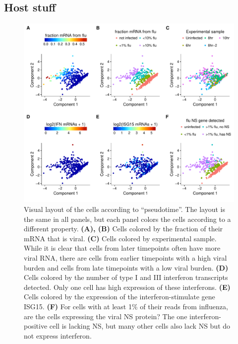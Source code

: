 \documentclass[9pt,lineno]{elife}
\begin{document}
\subsection{Host stuff}

\begin{figure}
\includegraphics[width=\linewidth]{figures/p_pseudo_merge.pdf}
\caption{\label{fig:pseudotime}
Visual layout of the cells according to ``pseudotime''.
The layout is the same in all panels, but each panel colors the cells according to a different property.
{\bf (A), (B)}
Cells colored by the fraction of their mRNA that is viral.
{\bf (C)}
Cells colored by experimental sample.
While it is clear that cells from later timepoints often have more viral RNA, there are cells from earlier timepoints with a high viral burden and cells from late timepoints with a low viral burden.
{\bf (D)}
Cells colored by the number of type I and III interferon transcripts detected.
Only one cell has high expression of these interferons.
{\bf (E)}
Cells colored by the expression of the interferon-stimulate gene ISG15.
{\bf (F)}
For cells with at least 1\% of their reads from influenza, are the cells expressing the viral NS protein?
The one interferon-positive cell is lacking NS, but many other cells also lack NS but do not express interferon.
}
\end{figure}
\end{document}
